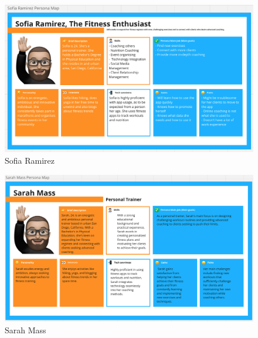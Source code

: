   \begin{figure}[H]
    \centering
    \includegraphics[width=1\textwidth]{Resources/SofiaRamirez.png}
    \caption{Sofia Ramirez}
    \label{fig:SofiaRamirez}
  \end{figure}
  \begin{figure}[H]
    \centering
    \includegraphics[width=1\textwidth]{Resources/SarahMass.png}
    \caption{Sarah Mass}
    \label{fig:SarahMass}
  \end{figure}

